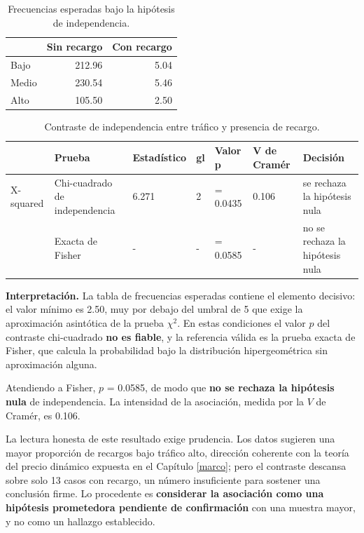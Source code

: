 \documentclass[
]{book}
\begin{document}
\begin{table}

\caption{\label{tab:h7}Frecuencias esperadas bajo la hipótesis de independencia.}
\centering
\begin{tabular}[t]{l|r|r}
\hline
  & Sin recargo & Con recargo\\
\hline
Bajo & 212.96 & 5.04\\
\hline
Medio & 230.54 & 5.46\\
\hline
Alto & 105.50 & 2.50\\
\hline
\end{tabular}
\end{table}

\begin{table}

\caption{\label{tab:h7-pruebas}Contraste de independencia entre tráfico y presencia de recargo.}
\centering
\begin{tabular}[t]{l|l|l|l|l|l|l}
\hline
  & Prueba & Estadístico & gl & Valor p & V de Cramér & Decisión\\
\hline
X-squared & Chi-cuadrado de independencia & 6.271 & 2 & = 0.0435 & 0.106 & se rechaza la hipótesis nula\\
\hline
 & Exacta de Fisher & - & - & = 0.0585 & - & no se rechaza la hipótesis nula\\
\hline
\end{tabular}
\end{table}

\textbf{Interpretación.} La tabla de frecuencias esperadas contiene el elemento decisivo: el valor
mínimo es 2.50, muy por debajo del umbral de 5 que exige la aproximación
asintótica de la prueba \(\chi^2\). En estas condiciones el valor \(p\) del contraste
chi-cuadrado \textbf{no es fiable}, y la referencia válida es la prueba exacta de Fisher, que
calcula la probabilidad bajo la distribución hipergeométrica sin aproximación alguna.

Atendiendo a Fisher, \(p\) = 0.0585, de modo que
\textbf{no se rechaza la hipótesis nula} de independencia. La intensidad de la asociación,
medida por la \(V\) de Cramér, es 0.106.

La lectura honesta de este resultado exige prudencia. Los datos sugieren una mayor proporción
de recargos bajo tráfico alto, dirección coherente con la teoría del precio dinámico expuesta
en el Capítulo \ref{marco}; pero el contraste descansa sobre solo
13 casos con recargo, un número insuficiente para sostener
una conclusión firme. Lo procedente es \textbf{considerar la asociación como una hipótesis
prometedora pendiente de confirmación} con una muestra mayor, y no como un hallazgo
establecido.
\end{document}
